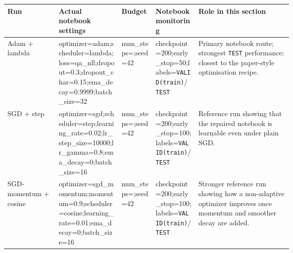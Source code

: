 \documentclass[10pt]{article}
\begin{document}
\scriptsize
\begin{center}
\setlength{\tabcolsep}{2pt}
\begin{tabularx}{\linewidth}{@{}>{\raggedright\arraybackslash}p{0.18\linewidth}>{\raggedright\arraybackslash}p{0.22\linewidth}>{\raggedright\arraybackslash}p{0.12\linewidth}>{\raggedright\arraybackslash}p{0.15\linewidth}>{\raggedright\arraybackslash}X@{}}
\toprule
\textbf{Run} & \textbf{Actual notebook settings} & \textbf{Budget} & \textbf{Notebook monitoring} & \textbf{Role in this section} \\
\midrule
Adam + lambda & optimizer=adam;\newline scheduler=lambda;\newline loss=qa\_nll;\newline dropout=0.3;\newline dropout\_char=0.15;\newline ema\_decay=0.9999;\newline batch\_size=32 & num\_steps=\newline 60000;\newline seed=42 & checkpoint=200;\newline early\_stop=50;\newline labels=\texttt{VALID(train)}\newline / \texttt{TEST} & Primary notebook route; strongest \texttt{TEST} performance; closest to the paper-style optimisation recipe. \\
SGD + step & optimizer=sgd;\newline scheduler=step;\newline learning\_rate=0.02;\newline lr\_step\_size=10000;\newline lr\_gamma=0.8;\newline ema\_decay=0;\newline batch\_size=16 & num\_steps=\newline 60000;\newline seed=42 & checkpoint=200;\newline early\_stop=100;\newline labels=\texttt{VALID(train)}\newline / \texttt{TEST} & Reference run showing that the repaired notebook is learnable even under plain SGD. \\
SGD-momentum + cosine & optimizer=sgd\_momentum;\newline momentum=0.9;\newline scheduler=cosine;\newline learning\_rate=0.01;\newline ema\_decay=0;\newline batch\_size=16 & num\_steps=\newline 60000;\newline seed=42 & checkpoint=200;\newline early\_stop=100;\newline labels=\texttt{VALID(train)}\newline / \texttt{TEST} & Stronger reference run showing how a non-adaptive optimizer improves once momentum and smoother decay are added. \\
\bottomrule
\end{tabularx}
\end{center}
\end{document}
